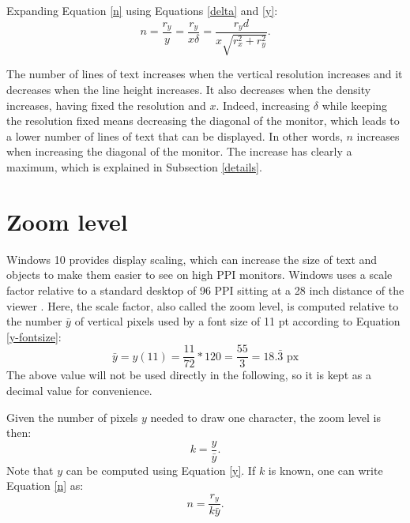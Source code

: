 \documentclass{article}
\begin{document}
Expanding Equation \eqref{n} using Equations \eqref{delta} and \eqref{y}:
\begin{equation} \label{n-expanded}
n = \frac{r_y}{y} = \frac{r_y}{x\delta} = \frac{r_yd}{x\sqrt{r_x^2+r_y^2}}.
\end{equation}

The number of lines of text increases when the vertical resolution increases and it decreases when the line height increases. It also decreases when the density increases, having fixed the resolution and $x$. Indeed, increasing $\delta$ while keeping the resolution fixed means decreasing the diagonal of the monitor, which leads to a lower number of lines of text that can be displayed. In other words, $n$ increases when increasing the diagonal of the monitor. The increase has clearly a maximum, which is explained in Subsection \ref{details}. 

\section{Zoom level}
Windows 10 provides display scaling, which can increase the size of text and objects to make them easier to see on high PPI monitors. Windows uses a scale factor relative to a standard desktop of 96 PPI sitting at a 28 inch distance of the viewer \cite{build}. Here, the scale factor, also called the zoom level, is computed relative to the number $\bar{y}$ of vertical pixels used by a font size of 11 pt according to Equation \ref{y-fontsize}:
\begin{equation}
\bar{y} = y(11) = \frac{11}{72}*120 = \frac{55}{3} = 18.\bar{3} \text{ px}
\end{equation}
The above value will not be used directly in the following, so it is kept as a decimal value for convenience.

Given the number of pixels $y$ needed to draw one character, the zoom level is then:
\begin{equation} \label{k}
k = \frac{y}{\bar{y}}.
\end{equation}
Note that $y$ can be computed using Equation \eqref{y}. If $k$ is known, one can write Equation \eqref{n} as:
\begin{equation}
n = \frac{r_y}{k\bar{y}}.
\end{equation}
\end{document}
